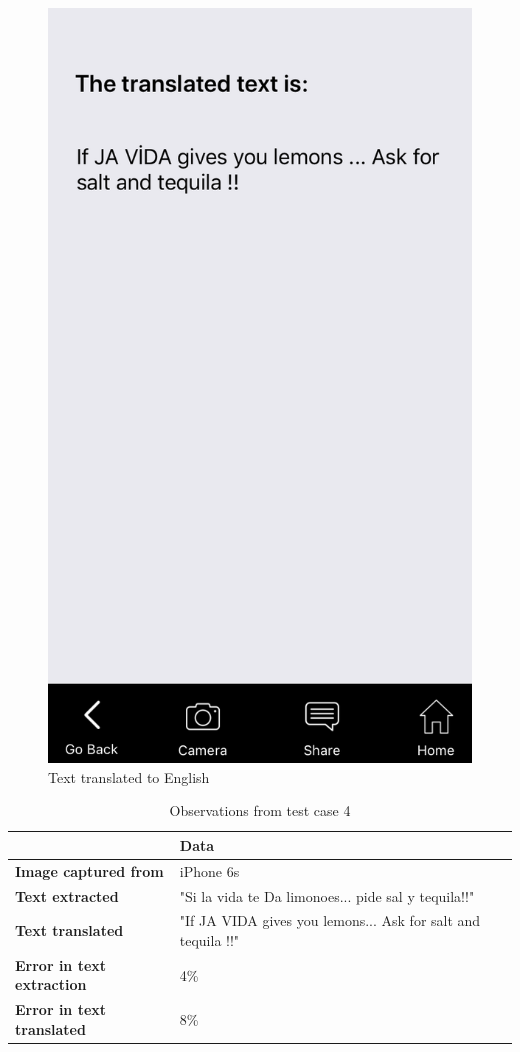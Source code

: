 \documentclass[12pt]{article}
\begin{document}
       \begin{figure}[H]
	\centering
	\includegraphics[width=0.5\linewidth]{media/case4b.png}
	\caption{Text translated to English}
	\label{fig:engs}
\end{figure} 

\begin{table}%
    \centering
   
    \label{my-label4}
       \begin{tabular}{|p{30mm}|p{55mm}|p{35mm}|}
 \hline
  & \textbf{Data}  \\ [0.5ex] 
 \hline\hline
 \textbf{Image captured from} & iPhone 6s \\
 \hline
  \textbf{Text extracted} & "Si la vida te Da limonoes... pide sal y tequila!!"  \\
 \hline
 \textbf{Text translated} & "If JA VIDA gives you lemons... Ask for salt and tequila !!"   \\
 \hline
 \textbf{Error in text extraction} & 4\%   \\
 \hline
 \textbf{Error in text translated} & 8\%   \\ [1ex] 
 \hline
    \end{tabular}
     \caption{Observations from test case 4} 
\end{table}
\end{document}
